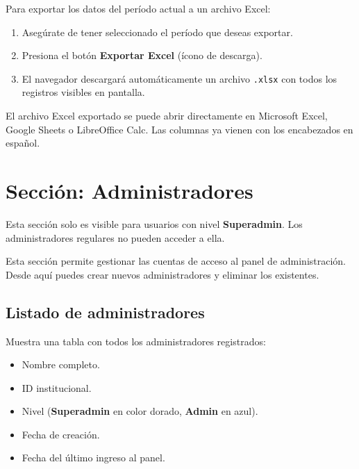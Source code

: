 \documentclass[12pt, a4paper]{article}
\begin{document}
Para exportar los datos del período actual a un archivo Excel:

\begin{enumerate}
  \item Asegúrate de tener seleccionado el período que deseas exportar.
  \item Presiona el botón \textbf{Exportar Excel} (ícono de descarga).
  \item El navegador descargará automáticamente un archivo
        \texttt{.xlsx} con todos los registros visibles en pantalla.
\end{enumerate}

\begin{tip}
  El archivo Excel exportado se puede abrir directamente en
  Microsoft Excel, Google Sheets o LibreOffice Calc. Las columnas
  ya vienen con los encabezados en español.
\end{tip}

\section{Sección: Administradores}
\label{sec:admins}

\begin{nota}
  Esta sección solo es visible para usuarios con nivel
  \textbf{Superadmin}. Los administradores regulares no pueden
  acceder a ella.
\end{nota}

Esta sección permite gestionar las cuentas de acceso al panel de
administración. Desde aquí puedes crear nuevos administradores y
eliminar los existentes.

\subsection{Listado de administradores}

Muestra una tabla con todos los administradores registrados:
\begin{itemize}
  \item Nombre completo.
  \item ID institucional.
  \item Nivel (\textbf{Superadmin} en color dorado, \textbf{Admin} en azul).
  \item Fecha de creación.
  \item Fecha del último ingreso al panel.
\end{itemize}
\end{document}
